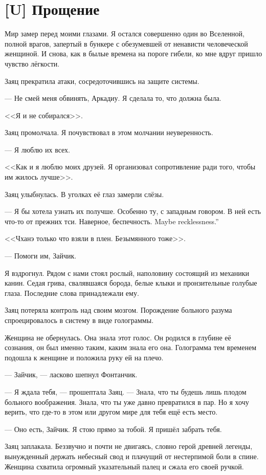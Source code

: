 \section{[U] Прощение}

Мир замер перед моими глазами.
Я остался совершенно один во Вселенной, полной врагов, запертый в бункере с обезумевшей от ненависти человеческой женщиной.
И снова, как в былые времена на пороге гибели, ко мне вдруг пришло чувство лёгкости.

Заяц прекратила атаки, сосредоточившись на защите системы.

--- Не смей меня обвинять, Аркадиу.
Я сделала то, что должна была.

<<Я и не собирался>>.

Заяц промолчала.
Я почувствовал в этом молчании неуверенность.

--- Я люблю их всех.

<<Как и я люблю моих друзей.
Я организовал сопротивление ради того, чтобы им жилось лучше>>.

Заяц улыбнулась.
В уголках её глаз замерли слёзы.

--- Я бы хотела узнать их получше.
Особенно ту, с западным говором.
В ней есть что-то от прежних тси.
{Наверное, беспечность.}
{Maybe recklessness.''}

<<Чханэ только что взяли в плен.
Безымянного тоже>>.

--- Помоги им, Зайчик.

Я вздрогнул.
Рядом с нами стоял рослый, наполовину состоящий из механики канин.
Седая грива, свалявшаяся борода, белые клыки и пронзительные голубые глаза.
Последние слова принадлежали ему.

Заяц потеряла контроль над своим мозгом.
Порождение больного разума спроецировалось в систему в виде голограммы.

Женщина не обернулась.
Она знала этот голос.
Он родился в глубине её сознания, он был именно таким, каким знала его она.
Голограмма тем временем подошла к женщине и положила руку ей на плечо.

--- Зайчик, --- ласково шепнул Фонтанчик.

--- Я ждала тебя, --- прошептала Заяц.
--- Знала, что ты будешь лишь плодом больного воображения.
Знала, что ты уже давно превратился в пар.
Но я хочу верить, что где-то в этом или другом мире для тебя ещё есть место.

--- Оно есть, Зайчик.
Я стою прямо за тобой.
Я пришёл забрать тебя.

Заяц заплакала.
Беззвучно и почти не двигаясь, словно герой древней легенды, вынужденный держать небесный свод и плачущий от нестерпимой боли в спине.
Женщина схватила огромный указательный палец и сжала его своей ручкой.

